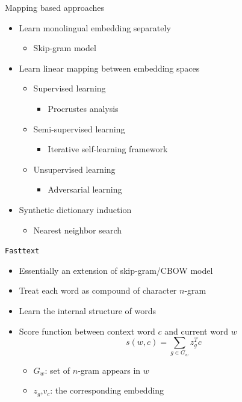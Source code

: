 \documentclass[11pt, a4paper, landscape]{article}
\begin{document}
	\NewPage
	\vfill
	Mapping based approaches
	\begin{itemize}
	\item Learn monolingual embedding separately
	\begin{itemize}
		\item Skip-gram model 
	\end{itemize}
	\item Learn linear mapping between embedding spaces	
	\begin{itemize}
		\item Supervised learning
		\begin{itemize}
			\item Procrustes analysis
		\end{itemize}
		\item Semi-supervised learning
		\begin{itemize}
			\item Iterative self-learning framework 
		\end{itemize}
		\item Unsupervised learning
		\begin{itemize}
			\item Adversarial learning
		\end{itemize}
	\end{itemize}
	\item Synthetic dictionary induction
	\begin{itemize}
		\item Nearest neighbor search
	\end{itemize}
	
\end{itemize}
	\vfill
	
	
	
	\NewPage
	\vfill



	\texttt{Fasttext} \cite{bojanowski2017enriching}
	\begin{itemize}
		\item Essentially an extension of skip-gram/CBOW model
		\item Treat each word as compound of character ${n}$-gram
		\item Learn the internal structure of words
		\item Score function between context word $c$ and current word $w$
		 \[s(w, c) = \sum_{g \in G_{w}} z_g^{T} c \]
		 \begin{itemize}
		 \item  ${G_w}$: set of $n$-gram appears in ${w}$ 
		 \item $z_g$,${v_c}$: the corresponding  embedding
		 \end{itemize}
	\end{itemize}
	
\end{document}
